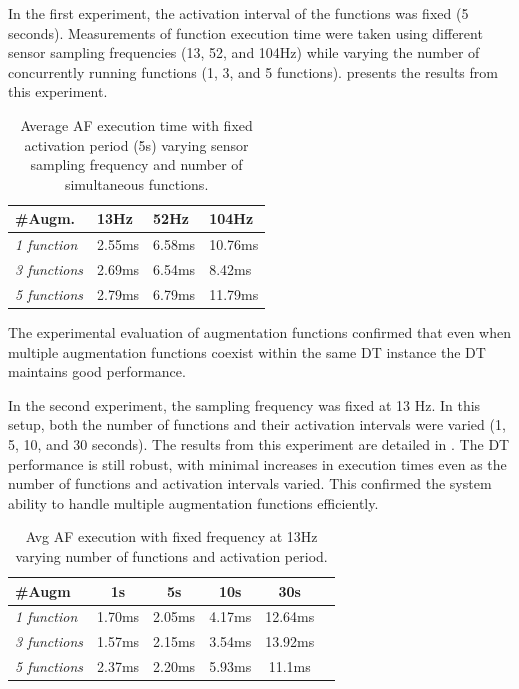 In the first experiment, the activation interval of the functions was fixed (5 seconds).
Measurements of function execution time were taken using different sensor sampling frequencies (13, 52, and 104Hz) while varying the number of concurrently running functions (1, 3, and 5 functions).
%
 presents the results from this experiment.
%
\begin{table}

    \centering
    \begin{tabular}{p{4cm} p{2cm} p{2cm} p{2cm}}
    \hline
    \textbf{\#Augm.} & \textbf{13Hz} & \textbf{52Hz} & \textbf{104Hz} \\ \hline
    \textit{1 function} & 2.55ms & 6.58ms & 10.76ms \\ \hline
    \textit{3 functions} & 2.69ms & 6.54ms & 8.42ms \\ \hline
    \textit{5 functions} & 2.79ms & 6.79ms & 11.79ms \\ \hline\hline
    \end{tabular}
    \caption{Average AF execution time with fixed activation period (5s) varying sensor sampling frequency and number of simultaneous functions.}
    \label{tab:AF_exec_time_fixed_act_period}
\end{table}
%
The experimental evaluation of augmentation functions confirmed that even when multiple augmentation functions coexist within the same DT instance the \ac{DT} maintains good performance.

In the second experiment, the sampling frequency was fixed at 13 Hz.
%
In this setup, both the number of functions and their activation intervals were varied (1, 5, 10, and 30 seconds). The results from this experiment are detailed in .
The \ac{DT} performance is still robust, with minimal increases in execution times even as the number of functions and activation intervals varied. This confirmed the system ability to handle multiple augmentation functions efficiently.
%
\begin{table}
    \centering
    \begin{tabular}{p{4cm} p{0.4cm} p{2cm} p{2cm} p{2cm} p{2cm}}
    \hline
    \textbf{\#Augm} & \multicolumn{1}{c}{\textbf{1s}} & \multicolumn{1}{c}{\textbf{5s}} & \multicolumn{1}{c}{\textbf{10s}} & \multicolumn{1}{c}{\textbf{30s}}\\ \hline
    \textit{1 function} & \multicolumn{1}{c}{1.70ms} & \multicolumn{1}{c}{2.05ms} & \multicolumn{1}{c}{4.17ms} & \multicolumn{1}{c}{12.64ms}\\ \hline
    \textit{3 functions} & \multicolumn{1}{c}{1.57ms} & \multicolumn{1}{c}{2.15ms} & \multicolumn{1}{c}{3.54ms} & \multicolumn{1}{c}{13.92ms}\\ \hline
    \textit{5 functions} & \multicolumn{1}{c}{2.37ms} & \multicolumn{1}{c}{2.20ms} & \multicolumn{1}{c}{5.93ms} & \multicolumn{1}{c}{11.1ms}\\ \hline\hline
    \end{tabular}
     \caption{Avg AF execution with fixed frequency at 13Hz varying number of functions and activation period.}
    \label{tab:AF_exec_time_fixed_sens_frequency}
\end{table}

